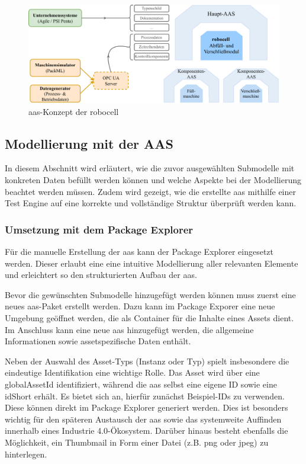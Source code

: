 \begin{figure}[htbp]
    \centering
    \includegraphics[width=1\textwidth]{Bilder/Konzeptionierung/konzeptionierung.pdf}
    \caption{\acs{aas}-Konzept der robocell}
    \label{fig:konzeptionierungAAS}
\end{figure}

\subsection{Modellierung mit der AAS}
In diesem Abschnitt wird erläutert, wie die zuvor ausgewählten Submodelle mit konkreten Daten befüllt werden können und welche Aspekte bei der Modellierung beachtet werden müssen.
Zudem wird gezeigt, wie die erstellte \acs{aas} mithilfe einer Test Engine auf eine korrekte und vollständige Struktur überprüft werden kann. 
\subsubsection{Umsetzung mit dem Package Explorer}
Für die manuelle Erstellung der \acs{aas} kann der Package Explorer eingesetzt werden.
Dieser erlaubt eine eine intuitive Modellierung aller relevanten Elemente und erleichtert so den strukturierten Aufbau der \acs{aas}.

Bevor die gewünschten Submodelle hinzugefügt werden können muss zuerst eine neues \acs{aas}-Paket erstellt werden.
Dazu kann im Package Exporer eine neue Umgebung geöffnet werden, die als Container für die Inhalte eines Assets dient.
Im Anschluss kann eine neue \acs{aas} hinzugefügt werden, die allgemeine Informationen sowie assetspezifische Daten enthält.

Neben der Auswahl des Asset-Typs (Instanz oder Typ) spielt insbesondere die eindeutige Identifikation eine wichtige Rolle.
Das Asset wird über eine globalAssetId identifiziert, während die \acs{aas} selbst eine eigene ID sowie eine idShort erhält.
Es bietet sich an, hierfür zunächst Beispiel-IDs zu verwenden. Diese können direkt im Package Explorer generiert werden.
Dies ist besonders wichtig für den späteren Austausch der \acs{aas} sowie das systemweite Auffinden innerhalb eines Industrie 4.0-Ökosystem.
Darüber hinaus besteht ebenfalls die Möglichkeit, ein Thumbmail in Form einer Datei (z.B. png oder jpeg) zu hinterlegen.

